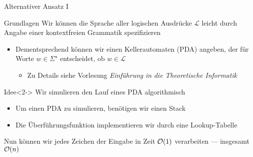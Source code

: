 
\begin{frame}{Alternativer Ansatz I}
\begin{block}{Grundlagen}
Wir k\"onnen die Sprache aller logischen Ausdr\"ucke $\mathcal{L}$ leicht durch Angabe einer \alert{kontextfreien Grammatik} spezifizieren
\begin{itemize}
    \item Dementsprechend k\"onnen wir einen \alert{Kellerautomaten} (PDA) angeben, der f\"ur Worte $w \in \Sigma^{\star}$ entscheidet, ob $w \in \mathcal{L}$
    \begin{itemize}
        \item Zu Details siehe Vorlesung \emph{Einf\"uhrung in die Theoretische Informatik}
    \end{itemize}
\end{itemize}
\end{block}

\begin{block}{Idee}<2->
Wir simulieren den Lauf eines PDA algorithmisch
\begin{itemize}
    \item Um einen PDA zu simulieren, ben\"otigen wir einen \alert{Stack}
    \item Die \alert{\"Uberf\"uhrungsfunktion} implementieren wir durch eine \alert{Lookup-Tabelle}
\end{itemize}

Nun k\"onnen wir jedes Zeichen der Eingabe in Zeit $\mathcal{O}(1)$ verarbeiten --- insgesamt $\mathcal{O}(n)$
\end{block}
\end{frame}

